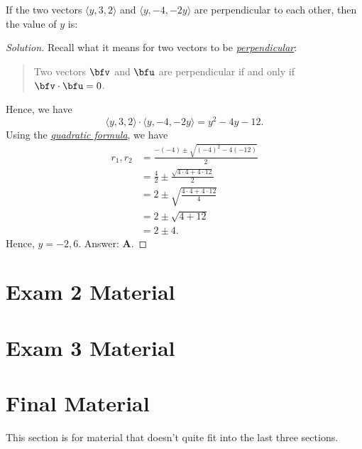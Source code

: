 \begin{problem}
If the two vectors $\langle y,3,2 \rangle$ and $\langle y,-4,-2y \rangle$
are perpendicular to each other, then the value of $y$ is:
\end{problem}
\begin{proof}[Solution]
Recall what it means for two vectors to be
\href{https://en.wikipedia.org/wiki/Dot_product#Properties}{\emph{perpendicular}}:
\begin{quote}
Two vectors $\bfv$ and $\bfu$ are perpendicular if and only if
$\bfv\cdot\bfu=0$.
\end{quote}
Hence, we have
\[
\langle y,3,2 \rangle\cdot\langle y,-4,-2y \rangle=y^2-4y-12.
\]
Using the
\href{https://en.wikipedia.org/wiki/Quadratic_formula}{\emph{quadratic
    formula}}, we have
\begin{align*}
r_1,r_2&=\frac{-(-4)\pm\sqrt{(-4)^2-4(-12)}}{2}\\
       &=\frac{4}{2}\pm\frac{\sqrt{4\cdot 4+4\cdot 12}}{2}\\
       &=2\pm\sqrt{\frac{4\cdot 4+4\cdot 12}{4}}\\
       &=2\pm\sqrt{4+12}\\
       &=2\pm 4.
\end{align*}
Hence, $y=-2,6$. Answer: \textbf{A}.
\end{proof}

\section{Exam 2 Material}
\section{Exam 3 Material}
\section{Final Material}
This section is for material that doesn't quite fit into the last three
sections.


